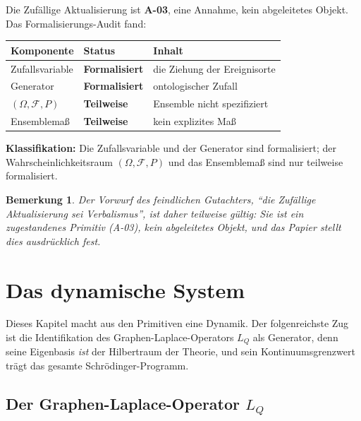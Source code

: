 \documentclass[10pt,twoside,openany]{book}
\newtheorem{remark}[theorem]{Bemerkung}
\begin{document}
Die Zufällige Aktualisierung ist \textbf{A-03}, eine Annahme, kein abgeleitetes Objekt.
Das Formalisierungs-Audit fand:

\begin{center}
\begin{tabular}{lll}
\toprule
Komponente & Status & Inhalt \\
\midrule
Zufallsvariable & \textbf{Formalisiert} & die Ziehung der Ereignisorte \\
Generator & \textbf{Formalisiert} & ontologischer Zufall \\
$(\Omega,\mathcal F,P)$ & \textbf{Teilweise} & Ensemble nicht spezifiziert \\
Ensemblemaß & \textbf{Teilweise} & kein explizites Maß \\
\bottomrule
\end{tabular}
\end{center}

\textbf{Klassifikation:} Die Zufallsvariable und der Generator sind formalisiert; der
Wahrscheinlichkeitsraum $(\Omega,\mathcal F,P)$ und das Ensemblemaß sind nur teilweise
formalisiert.

\begin{remark}
Der Vorwurf des feindlichen Gutachters, ``die Zufällige Aktualisierung sei Verbalismus'',
ist daher \emph{teilweise gültig}: Sie ist ein \emph{zugestandenes} Primitiv (A-03), kein
abgeleitetes Objekt, und das Papier stellt dies ausdrücklich fest.
\end{remark}


\chapter{Das dynamische System}
\label{ch:dynamics}

Dieses Kapitel macht aus den Primitiven eine Dynamik. Der folgenreichste Zug ist die
Identifikation des Graphen-Laplace-Operators $L_Q$ als Generator, denn seine Eigenbasis
\emph{ist} der Hilbertraum der Theorie, und sein Kontinuumsgrenzwert trägt das gesamte
Schr\"odinger-Programm.

\section{Der Graphen-Laplace-Operator $L_Q$}
\end{document}

